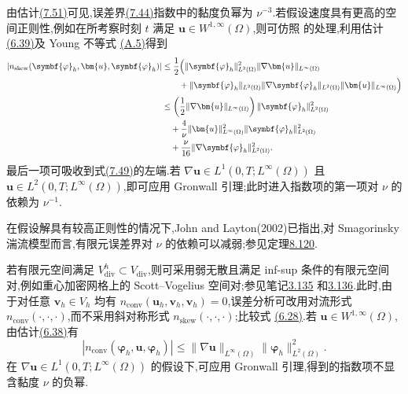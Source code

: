 \begin{note}[提高速度正则性假设以减弱黏度依赖]
\label{note:time-dependent-fem-error-viscosity-regularity}
由估计\hyperref[eq:time-dependent-fem-error-nonlinear-phi]{(7.51)}可见,误差界\hyperref[eq:time-dependent-fem-velocity-error]{(7.44)}指数中的黏度负幂为 $\nu^{-3}$.若假设速度具有更高的空间正则性,例如在所考察时刻 $t$ 满足
$\bm{u}\in W^{1,\infty}(\Omega)$,则可仿照
\textcite{BurmanFernandez2007,ArndtDallmannLube2015} 的处理,利用估计\hyperref[eq:steady-ns-conv-estimate-39]{(6.39)}及 Young 不等式
\hyperref[eq:appendix-a-5]{(A.5)}得到
\begin{equation}\label{eq:time-dependent-fem-error-higher-regularity}
\begin{aligned}
  |n_{\mathrm{skew}}(\symbf{\varphi}_h,\bm{u},
       \symbf{\varphi}_h)|
  &\le\frac12\Bigl(
       \|\symbf{\varphi}_h\|_{L^2(\Omega)}^2
       \|\nabla\bm{u}\|_{L^\infty(\Omega)}\\
  &\qquad+
       \|\symbf{\varphi}_h\|_{L^2(\Omega)}
       \|\nabla\symbf{\varphi}_h\|_{L^2(\Omega)}
       \|\bm{u}\|_{L^\infty(\Omega)}
       \Bigr)\\
  &\le\left(
       \frac12\|\nabla\bm{u}\|_{L^\infty(\Omega)}
       \right)\|\symbf{\varphi}_h\|_{L^2(\Omega)}^2\\
  &\quad+\frac{4}{\nu}\|\bm{u}\|_{L^\infty(\Omega)}^2
       \|\symbf{\varphi}_h\|_{L^2(\Omega)}^2\\
  &\quad+\frac{\nu}{16}
       \|\nabla\symbf{\varphi}_h\|_{L^2(\Omega)}^2.
\end{aligned}
\end{equation}
最后一项可吸收到式\hyperref[eq:time-dependent-fem-error-energy-equation]{(7.49)}的左端.若
$\nabla\bm{u}\in L^1(0,T;L^\infty(\Omega))$ 且
$\bm{u}\in L^2(0,T;L^\infty(\Omega))$,即可应用 Gronwall 引理;此时进入指数项的第一项对 $\nu$ 的依赖为 $\nu^{-1}$.

在假设解具有较高正则性的情况下,John and Layton(2002)已指出,对 Smagorinsky 湍流模型而言,有限元误差界对 $\nu$ 的依赖可以减弱;参见定理\hyperref[thm:smagorinsky-error-estimate]{8.120}.
\end{note}

\begin{note}[高正则性下指数项不显含黏度]
\label{note:time-dependent-fem-error-weak-divergence-free}
若有限元空间满足 $V_{\mathrm{div}}^h\subset V_{\mathrm{div}}$,则可采用弱无散且满足 inf-sup 条件的有限元空间对,例如重心加密网格上的 Scott--Vogelius 空间对;参见笔记\hyperref[note:scott-vogelius-2d]{3.135} 和\hyperref[note:scott-vogelius-3d]{3.136}.此时,由于对任意 $\bm{v}_h\in V_h$ 均有
$n_{\mathrm{conv}}(\bm{u}_h,\bm{v}_h,\bm{v}_h)=0$,误差分析可改用对流形式
$n_{\mathrm{conv}}(\cdot,\cdot,\cdot)$,而不采用斜对称形式
$n_{\mathrm{skew}}(\cdot,\cdot,\cdot)$;比较式
\hyperref[eq:steady-ns-convection-zero-conv]{(6.28)}.若 $\bm{u}\in W^{1,\infty}(\Omega)$,由估计\hyperref[eq:steady-ns-conv-estimate-38]{(6.38)}有
\[
  |n_{\mathrm{conv}}(\symbf{\varphi}_h,\bm{u},
       \symbf{\varphi}_h)| 
  \le \|\nabla\bm{u}\|_{L^\infty(\Omega)}
       \|\symbf{\varphi}_h\|_{L^2(\Omega)}^2.
\]
在 $\nabla\bm{u}\in L^1(0,T;L^\infty(\Omega))$ 的假设下,可应用 Gronwall 引理,得到的指数项不显含黏度 $\nu$ 的负幂.
\end{note}

